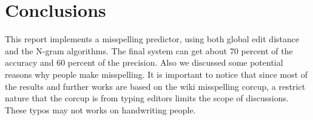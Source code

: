 \documentclass[11pt]{article}
\begin{document}
\section{Conclusions}
This report implements a misspelling predictor, using both global edit distance and the N-gram algorithms. The final system can get about 70 percent of the accuracy and 60 percent of the precision. Also we discussed some potential reasons why people make misspelling. It is important to notice that since most of the results and further works are based on the wiki misspelling corcup, a restrict nature that the corcup is from typing editors limits the scope of discussions. These typos may not works on handwriting people.



\end{document}

